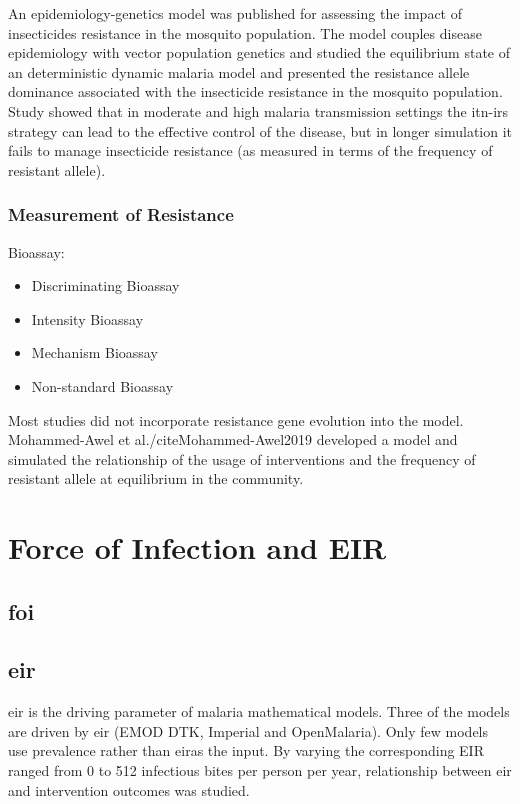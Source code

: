 \documentclass[a4paper, 12pt, twoside]{article}
\begin{document}
An epidemiology-genetics model was published\cite{Mohammed-Awel2019} for assessing the impact of insecticides resistance in the mosquito population.
The model couples disease epidemiology with vector population genetics and studied the equilibrium state of an deterministic dynamic malaria model and presented the resistance allele dominance associated with the insecticide resistance in the mosquito population.
Study showed that in moderate and high malaria transmission settings the \gls{itn}-\gls{irs} strategy can lead to the effective control of the disease, but in longer simulation it fails to manage insecticide resistance (as measured in terms of the frequency of resistant allele).

\subsubsection{Measurement of Resistance}

Bioassay:

\begin{itemize}
	\item Discriminating Bioassay
	\item Intensity Bioassay
	\item Mechanism Bioassay
	\item Non-standard Bioassay
\end{itemize}

Most studies did not incorporate resistance gene evolution into the model.
Mohammed-Awel et al./cite{Mohammed-Awel2019} developed a model and simulated the relationship of the usage of interventions and the frequency of resistant allele at equilibrium in the community. 

\section{Force of Infection and EIR}%
\label{sec:force_of_infection_and_eir}

\subsection{\texorpdfstring{\gls{foi}}{Force of Infection}}%
\label{sub:foi}

\subsection{\texorpdfstring{\gls{eir}}{EIR}}%
\label{sub:eir}
\gls{eir} is the driving parameter of malaria mathematical models.
Three of the models are driven by \gls{eir} (EMOD DTK, Imperial and OpenMalaria).
Only few models use prevalence rather than \gls{eir}as the input.
By varying the corresponding EIR ranged from 0 to 512 infectious bites per person per year, relationship between \gls{eir} and intervention outcomes was studied.
\end{document}

